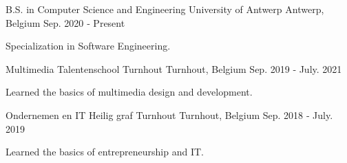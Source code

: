 
\begin{cventries}

  \cventry
    {B.S. in Computer Science and Engineering} %
    {University of Antwerp} %
    {Antwerp, Belgium} %
    {Sep. 2020 ‑ Present} %
    { %
      \begin{cvitems}
        \item {Specialization in Software Engineering.}
      \end{cvitems}
    }

  \cventry
    {Multimedia} %
    {Talentenschool Turnhout} %
    {Turnhout, Belgium} %
    {Sep. 2019 ‑ July. 2021} %
    { %
      \begin{cvitems}
        \item {Learned the basics of multimedia design and development.}
      \end{cvitems}
    }

  \cventry
    {Ondernemen en IT} %
    {Heilig graf Turnhout} %
    {Turnhout, Belgium} %
    {Sep. 2018 ‑ July. 2019} %
    { %
      \begin{cvitems}
        \item {Learned the basics of entrepreneurship and IT.}
      \end{cvitems}
    }

\end{cventries}
